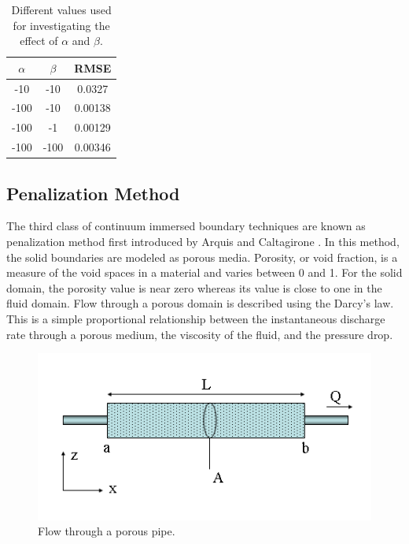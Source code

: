 \begin{table}[H]
\centering
\begin{tabular}{c | c | c}
     $\alpha$ & $\beta$ & RMSE \\ \hline \hline
     -10 & -10 & 0.0327 \\ \hline
     -100 & -10 & 0.00138 \\ \hline
     -100 & -1 & 0.00129 \\ \hline
     -100 & -100 & 0.00346 \\
\end{tabular}
\caption{Different values used for investigating the effect of $\alpha$ and $\beta$.}
\label{table:C3_virtualBoundaryResultConstantRSME}
\end{table}
\subsection{Penalization Method}
The third class of continuum immersed boundary techniques are known as penalization method first introduced by Arquis and Caltagirone \cite{ arquis1984conditions}. In this method, the solid boundaries are modeled as porous media. Porosity, or void fraction, is a measure of the void spaces in a material and varies between 0 and 1. For the solid domain, the porosity value is near zero whereas its value is close to one in the fluid domain. Flow through a porous domain is described using the Darcy's law. This is a simple proportional relationship between the instantaneous discharge rate through a porous medium, the viscosity of the fluid, and the pressure drop.

\begin{figure}[H]
    \centering
    \includegraphics[width=14.cm]{Chapter_3/figure/Darcys_Law.png}
    \caption{Flow through a porous pipe.}
    \label{fig:C3_darcyEquationPipe}
\end{figure}

